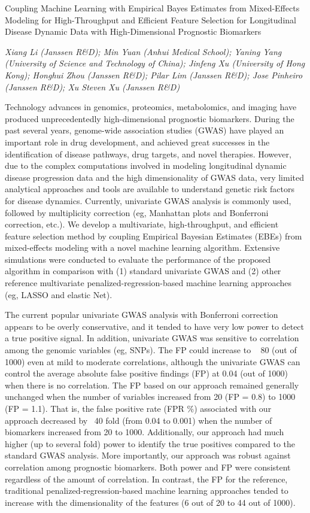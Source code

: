\begin{itemize}
Coupling Machine Learning with Empirical Bayes Estimates from Mixed-Effects Modeling for High-Throughput and Efficient Feature Selection for Longitudinal Disease Dynamic Data with High-Dimensional Prognostic Biomarkers

\emph{\footnotesize Xiang Li (Janssen R\&D); Min Yuan (Anhui Medical School); Yaning Yang (University of Science and Technology of China); Jinfeng Xu (University of Hong Kong); Honghui Zhou (Janssen R\&D); Pilar Lim (Janssen R\&D); Jose Pinheiro (Janssen R\&D); Xu Steven Xu (Janssen R\&D)}

Technology advances in genomics, proteomics, metabolomics, and imaging have produced unprecedentedly high-dimensional prognostic biomarkers. During the past several years, genome-wide association studies (GWAS) have played an important role in drug development, and achieved great successes in the identification of disease pathways, drug targets, and novel therapies. However, due to the complex computations involved in modeling longitudinal dynamic disease progression data and the high dimensionality of GWAS data, very limited analytical approaches and tools are available to understand genetic risk factors for disease dynamics. Currently, univariate GWAS analysis is commonly used, followed by multiplicity correction (eg, Manhattan plots and Bonferroni correction, etc.). We develop a multivariate, high-throughput, and efficient feature selection method by coupling Empirical Bayesian Estimates (EBEs) from mixed-effects modeling with a novel machine learning algorithm. Extensive simulations were conducted to evaluate the performance of the proposed algorithm in comparison with (1) standard univariate GWAS and (2) other reference multivariate penalized-regression-based machine learning approaches (eg, LASSO and elastic Net). 

The current popular univariate GWAS analysis with Bonferroni correction appears to be overly conservative, and it tended to have very low power to detect a true positive signal. In addition, univariate GWAS was sensitive to correlation among the genomic variables (eg, SNPs). The FP could increase to ~ 80 (out of 1000) even at mild to moderate correlations, although the univariate GWAS can control the average absolute false positive findings (FP) at 0.04 (out of 1000) when there is no correlation. The FP based on our approach remained generally unchanged when the number of variables increased from 20 (FP = 0.8) to 1000 (FP = 1.1). That is, the false positive rate (FPR \%) associated with our approach decreased by ~40 fold (from 0.04 to 0.001) when the number of biomarkers increased from 20 to 1000. Additionally, our approach had much higher (up to several fold) power to identify the true positives compared to the standard GWAS analysis. More importantly, our approach was robust against correlation among prognostic biomarkers. Both power and FP were consistent regardless of the amount of correlation. In contrast, the FP for the reference, traditional penalized-regression-based machine learning approaches tended to increase with the dimensionality of the features (6 out of 20 to 44 out of 1000). 


\end{itemize}
